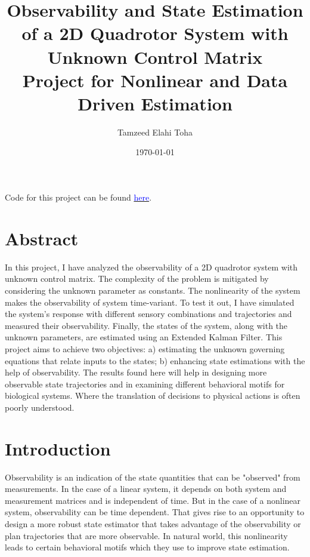 \documentclass[12pt]{article}
\title{Observability and State Estimation of a 2D Quadrotor System with Unknown Control Matrix \\ \large Project for Nonlinear and Data Driven Estimation}
\author{Tamzeed Elahi Toha}
\date{\today}
\begin{document}
\maketitle


Code for this project can be found \href{https://github.com/tamzeed-toha/Nonlinear_and_Data_Driven_Estimation/blob/main/project/phase_03.ipynb}{\textcolor{blue}{here}}.

\section*{Abstract}
In this project, I have analyzed the observability of a 2D quadrotor system with unknown control matrix. The complexity of the problem is mitigated by considering the unknown parameter as constants. The nonlinearity of the system makes the observability of system time-variant. To test it out, I have simulated the system's response with different sensory combinations and trajectories and measured their observability. Finally, the states of the system, along with the unknown parameters, are estimated using an Extended Kalman Filter. This project aims to achieve two objectives: a) estimating the unknown governing equations that relate inputs to the states; b) enhancing state estimations with the help of observability. The results found here will help in designing more observable state trajectories and in examining different behavioral motifs for biological systems. Where the translation of decisions to physical actions is often poorly understood.


\section*{Introduction}
Observability is an indication of the state quantities that can be "observed" from measurements. In the case of a linear system, it depends on both system and measurement matrices and is independent of time. But in the case of a nonlinear system, observability can be time dependent. That gives rise to an opportunity to design a more robust state estimator that takes advantage of the observability or plan trajectories that are more observable. In natural world, this nonlinearity leads to certain behavioral motifs which they use to improve state estimation. 
\end{document}
